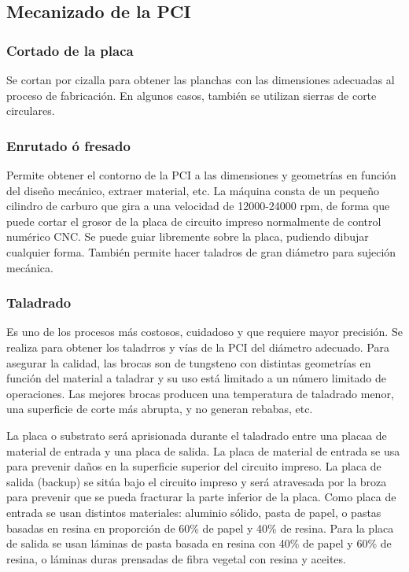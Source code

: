 \subsection{Mecanizado de la PCI}
\subsubsection{Cortado de la placa}
Se cortan por cizalla para obtener las planchas con las dimensiones adecuadas al proceso de fabricación. En algunos casos, también se utilizan sierras de corte circulares.

\subsubsection{Enrutado ó fresado}
Permite obtener el contorno de la PCI a las dimensiones y geometrías en función del diseño mecánico, extraer material, etc. La máquina consta de un pequeño cilindro de carburo que gira a una velocidad de 12000-24000 rpm, de forma que puede cortar el grosor de la placa de circuito impreso normalmente de control numérico CNC. Se puede guiar libremente sobre la placa, pudiendo dibujar cualquier forma. También permite hacer taladros de gran diámetro para sujeción mecánica.

\subsubsection{Taladrado}
Es uno de los procesos más costosos, cuidadoso y que requiere mayor precisión. Se realiza para obtener los taladrros y vías de la PCI del diámetro adecuado. Para asegurar la calidad, las brocas son de tungsteno con distintas geometrías en función del material a taladrar y su uso está limitado a un número limitado de operaciones. Las mejores brocas producen una temperatura de taladrado menor, una superficie de corte más abrupta, y no generan rebabas, etc.

La placa o substrato será aprisionada durante el taladrado entre una placaa de material de entrada y una placa de salida. La placa de material de entrada se usa para prevenir daños en la superficie superior del circuito impreso. La placa de salida (backup) se sitúa bajo el circuito impreso y será atravesada por la broza para prevenir que se pueda fracturar la parte inferior de la placa. Como placa de entrada se usan distintos materiales: aluminio sólido, pasta de papel, o pastas basadas en resina en proporción de 60\% de papel y 40\% de resina. Para la placa de salida se usan láminas de pasta basada en resina con 40\% de papel y 60\% de resina, o láminas duras prensadas de fibra vegetal con resina y aceites.

